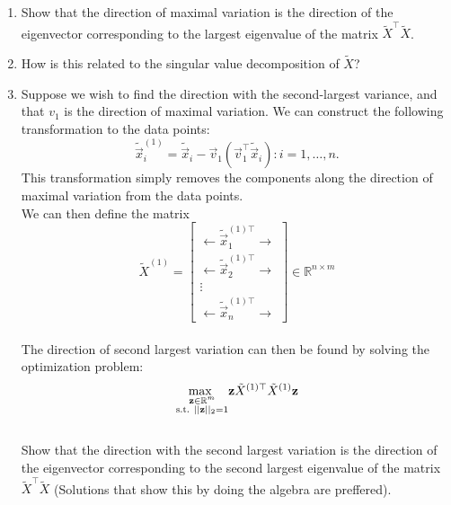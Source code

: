 \begin{enumerate}
\item
   Show that the direction of maximal variation is the direction of the eigenvector corresponding to the largest eigenvalue of the matrix $\tilde{X}^{\top}\tilde{X}$.
    \newline

\sol{}

\item
   How is this related to the singular value decomposition of $\tilde{X}$?
    \newline
    
\sol{}

 \item
    Suppose we wish to find the direction with the second-largest variance, and that $v_1$ is the  direction of maximal variation. We can construct the following transformation to the data points:
    $$\tilde{\vec{x}}_{i}^{(1)} = \tilde{\vec{x}}_i - \vec{v}_1(\vec{v}_1^{\top}\tilde{\vec{x}}_{i}):i = 1,\hdots, n.$$
    This transformation simply removes the components along the direction of maximal variation from the data points.
    \\
    We can then define the matrix 
    \begin{equation*}
    \tilde{X}^{(1)} = 
    \begin{bmatrix}
    \leftarrow \tilde{\vec{x}}^{(1)\top}_1 \rightarrow \\
    \leftarrow \tilde{\vec{x}}^{(1)\top}_2 \rightarrow \\
    \vdots       \\
    \leftarrow \tilde{\vec{x}}^{(1)\top}_n \rightarrow
    \end{bmatrix}
    \in \mathbb{R}^{n \times m}
    \end{equation*}
    \\
    The direction of second largest variation can then be found by solving the optimization problem:
    \begin{equation*}
        \underset{\begin{subarray}{c}
        \vec{z} \in \mathbb{R}^{m} \\
         \text{s.t. } ||\vec{z}||_2 = 1
    \end{subarray}}{\text{max }} \vec{z}\tilde{X}^{(1)\top}\tilde{X}^{(1)}\vec{z}
\end{equation*}
    \\
    Show that the direction with the second largest variation is the direction of the eigenvector corresponding to the second largest eigenvalue of the matrix $\tilde{X}^{\top}\tilde{X}$ (Solutions that show this by doing the algebra are preffered).
    

\end{enumerate}
